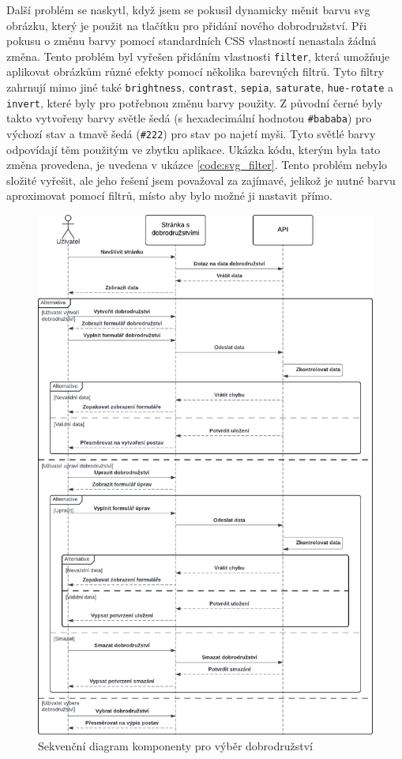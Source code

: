 Další problém se naskytl, když jsem se pokusil dynamicky měnit barvu svg obrázku, který je použit na tlačítku pro přidání nového dobrodružství. Při pokusu o změnu barvy pomocí standardních CSS vlastností nenastala žádná změna. Tento problém byl vyřešen přidáním vlastnosti \texttt{filter}, která umožňuje aplikovat obrázkům různé efekty pomocí několika barevných filtrů. Tyto filtry zahrnují mimo jiné také \texttt{brightness}, \texttt{contrast}, \texttt{sepia}, \texttt{saturate}, \texttt{hue-rotate} a \texttt{invert}, které byly pro potřebnou změnu barvy použity. Z původní černé byly takto vytvořeny barvy světle šedá (s hexadecimální hodnotou \texttt{\#bababa}) pro výchozí stav a tmavě šedá (\texttt{\#222}) pro stav po najetí myši. Tyto světlé barvy odpovídají těm použitým ve zbytku aplikace. Ukázka kódu, kterým byla tato změna provedena, je uvedena v ukázce \ref{code:svg_filter}. Tento problém nebylo složité vyřešit, ale jeho řešení jsem považoval za zajímavé, jelikož je nutné barvu aproximovat pomocí filtrů, místo aby bylo možné ji nastavit přímo.

\begin{figure}[htbp]
  \centering
  \includegraphics[width=.84\textwidth]{resources/figures/adventure_diagram.pdf}
  \caption{Sekvenční diagram komponenty pro výběr dobrodružství}
  \label{fig:adventure_diagram}
\end{figure}

